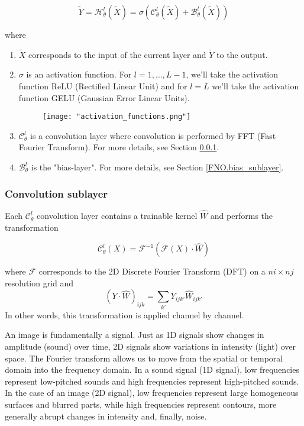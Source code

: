 \begin{equation*}
	\tilde{Y}=\mathcal{H}_\theta^l(\tilde{X})=\sigma\left(\mathcal{C}_\theta^l(\tilde{X})+\mathcal{B}_\theta^l(\tilde{X})\right)
\end{equation*}

where
\begin{enumerate}[label=\textbullet]
	\item $\tilde{X}$ corresponds to the input of the current layer and $\tilde{Y}$ to the output.
	\item $\sigma$ is an activation function. For $l=1,\dots,L-1$, we'll take the activation function ReLU (Rectified Linear Unit) and for $l=L$ we'll take the activation function GELU (Gaussian Error Linear Units).
	\begin{figure}[H]
		\centering
		\texttt{[image: "activation\_functions.png"]}
	\end{figure}
	
	\item $\mathcal{C}_\theta^l$ is a convolution layer where convolution is performed by FFT (Fast Fourier Transform). For more details, see Section \ref{FNO.conv_sublayer}.
	\item $\mathcal{B}_\theta^l$ is the "bias-layer". For more details, see Section \ref{FNO.bias_sublayer}.
\end{enumerate}

\subsubsection{Convolution sublayer} \label{FNO.conv_sublayer}

Each $\mathcal{C}_\theta^l$ convolution layer contains a trainable kernel $\hat{W}$ and performs the transformation

\begin{equation*}
	\mathcal{C}_\theta^l(X)=\mathcal{F}^{-1}(\mathcal{F}(X)\cdot\hat{W})
\end{equation*}

where $\mathcal{F}$ corresponds to the 2D Discrete Fourier Transform (DFT) on a $ni\times nj$ resolution grid and
\begin{equation*}
	(Y\cdot\hat{W})_{ijk}=\sum_{k'}Y_{ijk'}\hat{W}_{ijk'}
\end{equation*}
In other words, this transformation is applied channel by channel.

\begin{Rem}
	An image is fundamentally a signal. Just as 1D signals show changes in amplitude (sound) over time, 2D signals show variations in intensity (light) over space. The Fourier transform allows us to move from the spatial or temporal domain into the frequency domain. In a sound signal (1D signal), low frequencies represent low-pitched sounds and high frequencies represent high-pitched sounds. In the case of an image (2D signal), low frequencies represent large homogeneous surfaces and blurred parts, while high frequencies represent contours, more generally abrupt changes in intensity and, finally, noise.
\end{Rem}

